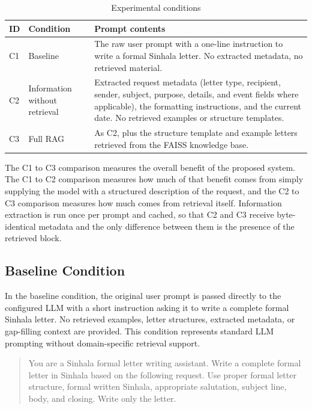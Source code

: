 \documentclass[12pt]{uomthesis}
\begin{document}
\begin{table}[!htbp]
\centering
\small
\begin{tabularx}{\linewidth}{@{}p{1.0cm}p{3.3cm}X@{}}
\toprule
\textbf{ID} & \textbf{Condition} & \textbf{Prompt contents} \\
\midrule
C1 & Baseline & The raw user prompt with a one-line instruction to write a formal Sinhala letter. No extracted metadata, no retrieved material. \\
C2 & Information without retrieval & Extracted request metadata (letter type, recipient, sender, subject, purpose, details, and event fields where applicable), the formatting instructions, and the current date. No retrieved examples or structure templates. \\
C3 & Full RAG & As C2, plus the structure template and example letters retrieved from the FAISS knowledge base. \\
\bottomrule
\end{tabularx}
\caption{Experimental conditions}
\label{tab:experimental_conditions}
\end{table}

The C1 to C3 comparison measures the overall benefit of the proposed system. The C1 to C2 comparison measures how much of that benefit comes from simply supplying the model with a structured description of the request, and the C2 to C3 comparison measures how much comes from retrieval itself. Information extraction is run once per prompt and cached, so that C2 and C3 receive byte-identical metadata and the only difference between them is the presence of the retrieved block.

\subsection{Baseline Condition}

In the baseline condition, the original user prompt is passed directly to the configured LLM with a short instruction asking it to write a complete formal Sinhala letter. No retrieved examples, letter structures, extracted metadata, or gap-filling context are provided. This condition represents standard LLM prompting without domain-specific retrieval support.

\begin{quote}
\small
You are a Sinhala formal letter writing assistant. Write a complete formal letter in Sinhala based on the following request. Use proper formal letter structure, formal written Sinhala, appropriate salutation, subject line, body, and closing. Write only the letter.
\end{quote}
\end{document}
